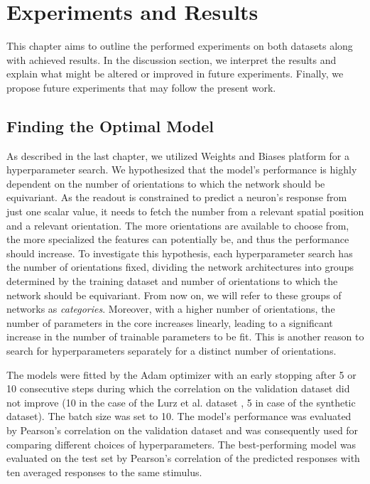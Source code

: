 \chapter{Experiments and Results}

This chapter aims to outline the performed experiments on both datasets along with achieved results. In the discussion section, we interpret the results and explain what might be altered or improved in future experiments. Finally, we propose future experiments that may follow the present work.

\section{Finding the Optimal Model}

As described in the last chapter, we utilized Weights and Biases platform for a hyperparameter search. We hypothesized that the model’s performance is highly dependent on the number of orientations to which the network should be equivariant. As the readout is constrained to predict a neuron's response from just one scalar value, it needs to fetch the number from a relevant spatial position and a relevant orientation. The more orientations are available to choose from, the more specialized the features can potentially be, and thus the performance should increase. To investigate this hypothesis, each hyperparameter search has the number of orientations fixed, dividing the network architectures into groups determined by the training dataset and number of orientations to which the network should be equivariant. From now on, we will refer to these groups of networks as \emph{categories}. Moreover, with a higher number of orientations, the number of parameters in the core increases linearly, leading to a significant increase in the number of trainable parameters to be fit. This is another reason to search for hyperparameters separately for a distinct number of orientations.

The models were fitted by the Adam optimizer \citep{kingma2014adam} with an early stopping after 5 or 10 consecutive steps during which the correlation on the validation dataset did not improve (10 in the case of the Lurz et al. dataset \citep{lurz2021generalization}, 5 in case of the synthetic dataset). The batch size was set to 10. The model’s performance was evaluated by Pearson’s correlation on the validation dataset and was consequently used for comparing different choices of hyperparameters. The best-performing model was evaluated on the test set by Pearson’s correlation of the predicted responses with ten averaged responses to the same stimulus.


